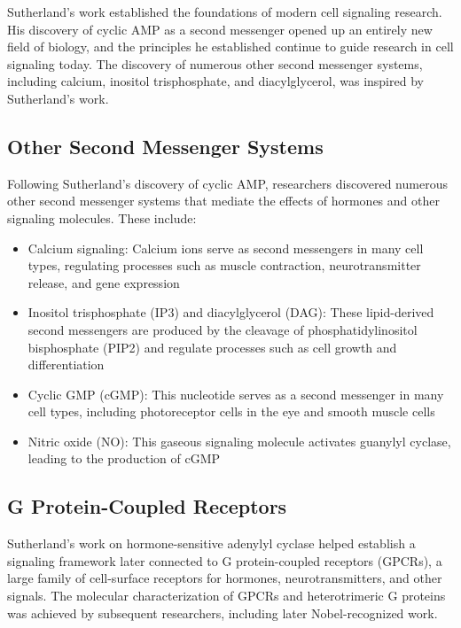 Sutherland's work established the foundations of modern cell signaling research. His discovery of cyclic AMP as a second messenger opened up an entirely new field of biology, and the principles he established continue to guide research in cell signaling today. The discovery of numerous other second messenger systems, including calcium, inositol trisphosphate, and diacylglycerol, was inspired by Sutherland's work.

\subsection{Other Second Messenger Systems}

Following Sutherland's discovery of cyclic AMP, researchers discovered numerous other second messenger systems that mediate the effects of hormones and other signaling molecules. These include:

\begin{itemize}
\item Calcium signaling: Calcium ions serve as second messengers in many cell types, regulating processes such as muscle contraction, neurotransmitter release, and gene expression
\item Inositol trisphosphate (IP3) and diacylglycerol (DAG): These lipid-derived second messengers are produced by the cleavage of phosphatidylinositol bisphosphate (PIP2) and regulate processes such as cell growth and differentiation
\item Cyclic GMP (cGMP): This nucleotide serves as a second messenger in many cell types, including photoreceptor cells in the eye and smooth muscle cells
\item Nitric oxide (NO): This gaseous signaling molecule activates guanylyl cyclase, leading to the production of cGMP
\end{itemize}

\subsection{G Protein-Coupled Receptors}

Sutherland's work on hormone-sensitive adenylyl cyclase helped establish a signaling framework later connected to G protein-coupled receptors (GPCRs), a large family of cell-surface receptors for hormones, neurotransmitters, and other signals. The molecular characterization of GPCRs and heterotrimeric G proteins was achieved by subsequent researchers, including later Nobel-recognized work.

